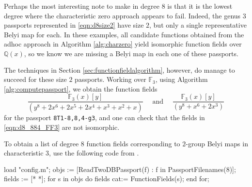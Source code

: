\documentclass{dcthesis}
\newcommand{\QQ}{\mathbb Q}
\newcommand{\FF}{\mathbb{F}}
\numberwithin{equation}{section}
\theoremstyle{definition}
\theoremstyle{remark}
\begin{document}
{{{\begin{magma}
    \end{magma}
    \par
    Perhaps the most interesting note to make
    in degree $8$ is that it is
    the lowest degree where the
    characteristic zero approach
    appears to fail.
    Indeed, the genus $3$ passports
    represented in
    \eqref{eqn:d8size2}
    have size $2$, but only a single
    representative Belyi map for each.
    In these examples,
    all candidate functions obtained from
    the adhoc approach in
    Algorithm
    \ref{alg:charzero}
    yield isomorphic function fields
    over $\QQ(x)$,
    so we know we are missing a
    Belyi map in each one of these passports.
    \par
    The techniques in
    Section \ref{sec:functionfieldalgorithm},
    however,
    do manage to succeed for these
    size $2$ passports.
    Working over $\FF_3$,
    using Algorithm
    \ref{alg:computepassport},
    we obtain the
    function fields
    \begin{equation}
      \label{eqn:d8_884_FF3}
      \frac{\FF_3(x)[y]}{(y^8 + 2x^6 + 2x^5 + 2x^4 + x^3 + x^2 + x)}\quad\text{ and }\quad
      \frac{\FF_3(x)[y]}{(y^8 + x^6 + 2x^3)}
    \end{equation}
    for the passport \texttt{8T1-8,8,4-g3},
    and one can check that the
    fields in \eqref{eqn:d8_884_FF3}
    are not isomorphic.
    \par
    To obtain a list of degree $8$
    function fields corresponding to
    $2$-group Belyi maps
    in characteristic $3$,
    use the following code from
    \cite{twogroupdessins}.
    \begin{magma}
load "config.m";
objs := [ReadTwoDBPassport(f) : f in PassportFilenames(8)];
fields := [* *];
for s in objs do
  fields cat:= FunctionFields(s);
end for;
    \end{magma}
  }
}}
\end{document}

